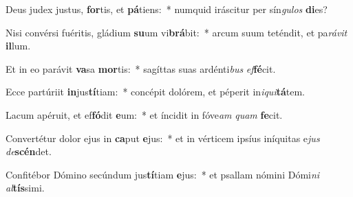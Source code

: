 \item Deus judex justus, \textbf{for}tis, et \textbf{pá}tiens:~* numquid iráscitur per sín\textit{gu}\textit{los} \textbf{di}es?
\item Nisi convérsi fuéritis, gládium \textbf{su}um vi\textbf{brá}bit:~* arcum suum teténdit, et pa\textit{rá}\textit{vit} \textbf{il}lum.
\item Et in eo parávit \textbf{va}sa \textbf{mor}tis:~* sagíttas suas ardénti\textit{bus} \textit{ef}\textbf{fé}cit.
\item Ecce partúriit \textbf{in}jus\textbf{tí}tiam:~* concépit dolórem, et péperit in\textit{i}\textit{qui}\textbf{tá}tem.
\item Lacum apéruit, et ef\textbf{fó}dit \textbf{e}um:~* et íncidit in fóve\textit{am} \textit{quam} \textbf{fe}cit.
\item Convertétur dolor ejus in \textbf{ca}put \textbf{e}jus:~* et in vérticem ipsíus iníquitas e\textit{jus} \textit{de}\textbf{scén}det.
\item Confitébor Dómino secúndum jus\textbf{tí}tiam \textbf{e}jus:~* et psallam nómini Dómi\textit{ni} \textit{al}\textbf{tís}simi.
